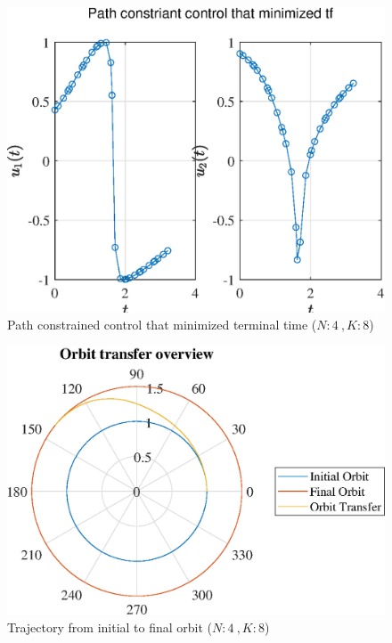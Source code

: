 \documentclass[]{article}
\begin{document}
	\begin{figure}
		\centering
		\includegraphics[scale=0.75]{path_N4_K8_C3_tf.eps}
		\caption{Path constrained control that minimized terminal time (\(N:4\ , K:8\))}
		\label{fig:path_N4_K8_C3_tf}
	\end{figure}
	\begin{figure}
		\centering
		\includegraphics[scale=0.75]{orbit_N4_K8_C3_tf.eps}
		\caption{Trajectory from initial to final orbit (\(N:4\ , K:8\))}
		\label{fig:orbit_N4_K8_C3_tf}
	\end{figure}
\end{document}
